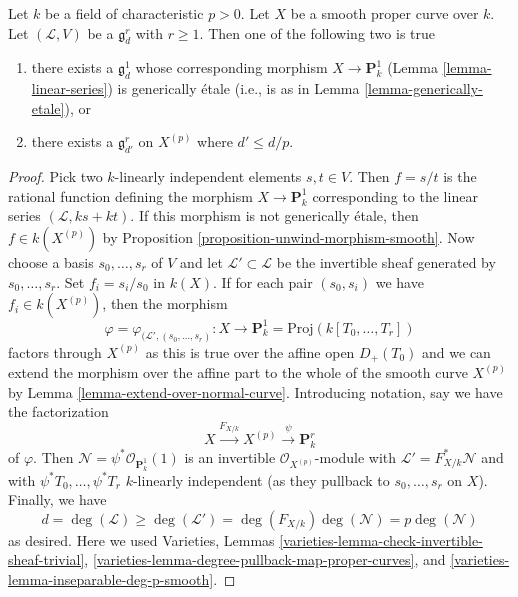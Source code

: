 \begin{lemma}
\label{lemma-inseparable-linear-system}
Let $k$ be a field of characteristic $p > 0$. Let $X$ be a smooth proper
curve over $k$. Let $(\mathcal{L}, V)$ be a $\mathfrak g^r_d$ with $r \geq 1$.
Then one of the following two is true
\begin{enumerate}
\item there exists a $\mathfrak g^1_d$ whose corresponding morphism
$X \to \mathbf{P}^1_k$ (Lemma \ref{lemma-linear-series})
is generically \'etale (i.e., is as in Lemma \ref{lemma-generically-etale}), or
\item there exists a $\mathfrak g^r_{d'}$ on $X^{(p)}$ where
$d' \leq d/p$.
\end{enumerate}
\end{lemma}

\begin{proof}
Pick two $k$-linearly independent elements $s, t \in V$.
Then $f = s/t$ is the rational function defining the morphism
$X \to \mathbf{P}^1_k$ corresponding to the linear series
$(\mathcal{L}, ks + kt)$. If this morphism is not
generically \'etale, then $f \in k(X^{(p)})$ by
Proposition \ref{proposition-unwind-morphism-smooth}.
Now choose a basis $s_0, \ldots, s_r$ of $V$ and let
$\mathcal{L}' \subset \mathcal{L}$ be the invertible sheaf
generated by $s_0, \ldots, s_r$. Set $f_i = s_i/s_0$ in $k(X)$.
If for each pair $(s_0, s_i)$ we have $f_i \in k(X^{(p)})$, then
the morphism
$$
\varphi = \varphi_{(\mathcal{L}', (s_0, \ldots, s_r)} :
X
\longrightarrow
\mathbf{P}^1_k = \text{Proj}(k[T_0, \ldots, T_r])
$$
factors through $X^{(p)}$ as this is true over the affine open
$D_+(T_0)$ and we can extend the morphism over the affine part
to the whole of the smooth curve $X^{(p)}$ by
Lemma \ref{lemma-extend-over-normal-curve}.
Introducing notation, say we have the factorization
$$
X \xrightarrow{F_{X/k}} X^{(p)} \xrightarrow{\psi} \mathbf{P}^r_k
$$
of $\varphi$. Then $\mathcal{N} = \psi^*\mathcal{O}_{\mathbf{P}^1_k}(1)$
is an invertible $\mathcal{O}_{X^{(p)}}$-module with
$\mathcal{L}' = F_{X/k}^*\mathcal{N}$ and with
$\psi^*T_0, \ldots, \psi^*T_r$ $k$-linearly independent
(as they pullback to $s_0, \ldots, s_r$ on $X$).
Finally, we have
$$
d = \deg(\mathcal{L}) \geq \deg(\mathcal{L}') =
\deg(F_{X/k}) \deg(\mathcal{N}) = p \deg(\mathcal{N})
$$
as desired. Here we used Varieties, Lemmas
\ref{varieties-lemma-check-invertible-sheaf-trivial},
\ref{varieties-lemma-degree-pullback-map-proper-curves}, and
\ref{varieties-lemma-inseparable-deg-p-smooth}.
\end{proof}

